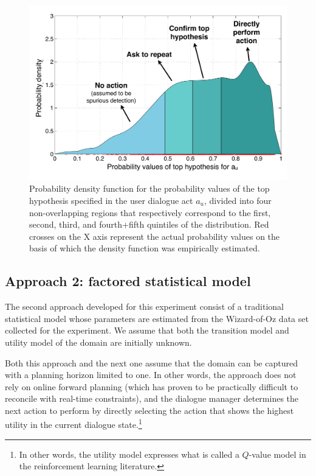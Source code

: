 \begin{figure}[h!]
\centering
\includegraphics[scale=0.45]{imgs/asrconfidence.pdf} 
\caption{Probability density function for the probability values of the top hypothesis specified in the user dialogue act $a_u$, divided into four non-overlapping regions that respectively correspond to the first, second, third, and fourth+fifth quintiles of the distribution. Red crosses on the X axis represent the actual probability values on the basis of which the density function was empirically estimated. }
\label{fig:asrconfidence-exp3}
\end{figure}


\subsection{Approach 2: factored statistical model}

The second approach developed for this experiment consist of a traditional statistical model whose parameters are estimated from the Wizard-of-Oz data set collected for the experiment.   We assume that both the transition model and utility model of the domain are initially unknown. 

Both this approach and the next one assume that the domain can be captured with a planning horizon limited to one.  In other words, the approach does not rely on online forward planning (which has proven to be practically difficult to reconcile with real-time constraints), and the dialogue manager determines the next action to perform by directly selecting the action that shows the highest utility in the current dialogue state.\footnote{In other words, the utility model expresses what is called a $Q$-value model in the reinforcement learning literature.}

